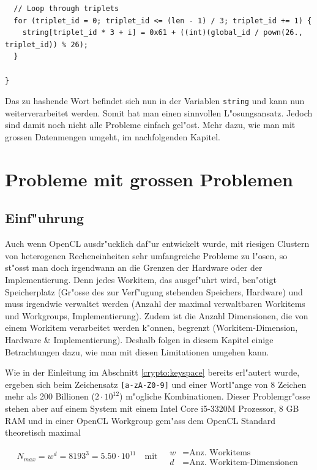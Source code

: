 \begin{refsection}
\begin{small}
\begin{verbatim}
  // Loop through triplets
  for (triplet_id = 0; triplet_id <= (len - 1) / 3; triplet_id += 1) {
    string[triplet_id * 3 + i] = 0x61 + ((int)(global_id / pown(26., triplet_id)) % 26);
  }

}
\end{verbatim}
\end{small}

\noindent Das zu hashende Wort befindet sich nun in der Variablen
\texttt{string} und kann nun weiterverarbeitet werden. Somit hat man einen
sinnvollen L"osungsansatz. Jedoch sind damit noch nicht alle Probleme einfach
gel"ost. Mehr dazu, wie man mit grossen Datenmengen umgeht, im nachfolgenden
Kapitel.


\section{Probleme mit grossen Problemen}
\label{crypto:grosse_probleme}

\subsection{Einf"uhrung}

Auch wenn OpenCL ausdr"ucklich daf"ur entwickelt wurde, mit riesigen Clustern
von heterogenen Recheneinheiten sehr umfangreiche Probleme zu l"osen, so st"osst
man doch irgendwann an die Grenzen der Hardware oder der Implementierung.  Denn
jedes Workitem, das ausgef"uhrt wird, ben"otigt Speicherplatz (Gr"osse des zur
Verf"ugung stehenden Speichers, Hardware) und muss irgendwie verwaltet werden
(Anzahl der maximal verwaltbaren Workitems und Workgroups, Implementierung).
Zudem ist die Anzahl Dimensionen, die von einem Workitem verarbeitet werden
k"onnen, begrenzt (Workitem-Dimension, Hardware \& Implementierung). Deshalb
folgen in diesem Kapitel einige Betrachtungen dazu, wie man mit diesen
Limitationen umgehen kann.

Wie in der Einleitung im Abschnitt \ref{crypto:keyspace} bereits erl"autert
wurde, ergeben sich beim Zeichensatz \texttt{[a-zA-Z0-9]} und einer Wortl"ange
von 8 Zeichen mehr als 200 Billionen ($2 \cdot 10^{12}$) m"ogliche Kombinationen.
Dieser Problemgr"osse stehen aber auf einem System mit einem Intel Core i5-3320M
Prozessor, 8 GB RAM und in einer OpenCL Workgroup gem"ass dem OpenCL Standard
theoretisch maximal

\[
	N_{max} = w^d = 8193^{3} = 5.50 \cdot 10^{11} \quad\textrm{mit}\quad
	\begin{aligned}
		w &= \textrm{Anz. Workitems}\\
		d &= \textrm{Anz. Workitem-Dimensionen}
	\end{aligned}
\]


\end{refsection}
